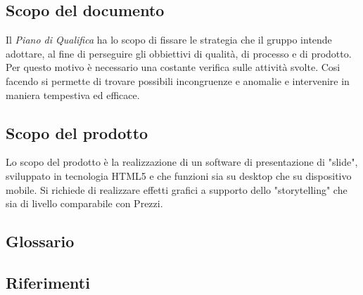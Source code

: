 \subsection{Scopo del documento}
Il \textit{Piano di Qualifica} ha lo scopo di fissare le strategia che il gruppo intende adottare, al fine di perseguire gli obbiettivi di qualità, di processo e di prodotto. Per questo motivo è necessario una costante verifica sulle attività svolte. Cosi facendo si permette di trovare possibili incongruenze e anomalie e intervenire in maniera tempestiva ed efficace.
\subsection{Scopo del prodotto}
Lo scopo del prodotto è la realizzazione di un software di presentazione di "slide", sviluppato in tecnologia HTML5 e che funzioni sia su desktop che su dispositivo mobile. Si richiede di realizzare effetti grafici a supporto dello "storytelling" che sia di livello comparabile con Prezzi.
\subsection{Glossario}

\subsection{Riferimenti}
